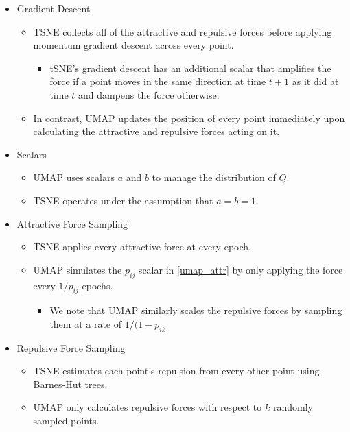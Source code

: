 \documentclass[sigconf, nonacm]{acmart}
\begin{document}
\begin{itemize}
    \item Gradient Descent
        \begin{itemize}
        \item TSNE collects all of the attractive and repulsive forces before applying momentum gradient descent across every point.
            \begin{itemize}
            \item tSNE's gradient descent has an additional scalar that amplifies the force if a point moves in the same direction at time $t+1$ as it did at time $t$
                and dampens the force otherwise.
            \end{itemize}
        \item In contrast, UMAP updates the position of every point immediately upon calculating the attractive and repulsive forces acting on it.
        \end{itemize}

    \item Scalars
        \begin{itemize}
        \item UMAP uses scalars $a$ and $b$ to manage the distribution of $Q$.
        \item TSNE operates under the assumption that $a = b = 1$.
        \end{itemize}

    \item Attractive Force Sampling
        \begin{itemize}
        \item TSNE applies every attractive force at every epoch.
        \item UMAP simulates the $p_{ij}$ scalar in \ref{umap_attr} by only applying the force every $1 / p_{ij}$ epochs.
            \begin{itemize}
                \item We note that UMAP similarly scales the repulsive forces by sampling them at a rate of $1 / (1 - p_{ik}$
            \end{itemize}
        \end{itemize}

    \item Repulsive Force Sampling
        \begin{itemize}
        \item TSNE estimates each point's repulsion from every other point using Barnes-Hut trees.
        \item UMAP only calculates repulsive forces with respect to $k$ randomly sampled points.
        \end{itemize}


\end{itemize}
\end{document}
